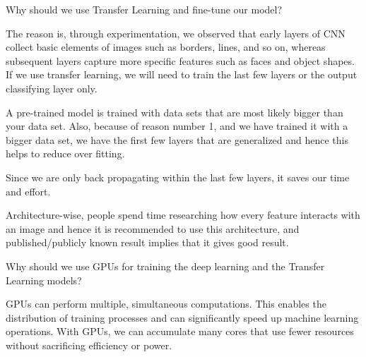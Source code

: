 	\begin{qanda}
		\begin{question}
Why should we use Transfer Learning and fine-tune our model?
		\end{question}
		\begin{answer}
The reason is, through experimentation, we observed that early layers of CNN collect basic elements of images such as borders, lines, and so on, whereas subsequent layers capture more specific features such as faces and object shapes. If we use transfer learning, we will need to train the last few layers or the output classifying layer only.

A pre-trained model is trained with data sets that are most likely bigger than your data set. Also, because of reason number 1, and we have trained it with a bigger data set, we have the first few layers that are generalized and hence this helps to reduce over fitting.

Since we are only back propagating within the last few layers, it saves our time and effort.

Architecture-wise, people spend time researching how every feature interacts with an image and hence it is recommended to use this architecture, and published/publicly known result implies that it gives good result.
		\end{answer}
	\end{qanda}

	\begin{qanda}
		\begin{question}
Why should we use GPUs for training the deep learning and the Transfer Learning models?
		\end{question}
		\begin{answer}
GPUs can perform multiple, simultaneous computations. This enables the distribution of training processes and can significantly speed up machine learning operations. With GPUs, we can accumulate many cores that use fewer resources without sacrificing efficiency or power.
		\end{answer}
	\end{qanda}


